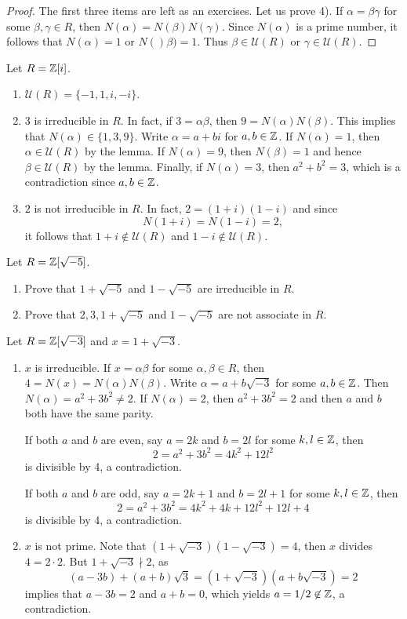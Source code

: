 \begin{proof}
	The first three items are left as an exercises. Let us prove 4). 
	If $\alpha=\beta\gamma$ for some $\beta,\gamma\in R$, then
	$N(\alpha)=N(\beta)N(\gamma)$. Since $N(\alpha)$ is a prime number, it follows that
	$N(\alpha)=1$ or $N()\beta)=1$. Thus $\beta\in\mathcal{U}(R)$ or $\gamma\in\mathcal{U}(R)$. 	
\end{proof}

\begin{example}
	Let $R=\mathbb{Z}[i]$. 
	\begin{enumerate}
		\item $\mathcal{U}(R)=\{-1,1,i,-i\}$.
		\item $3$ is irreducible in $R$. In fact, if $3=\alpha\beta$, then
			$9=N(\alpha)N(\beta)$. This implies that $N(\alpha)\in\{1,3,9\}$. Write
			$\alpha=a+bi$ for $a,b\in\mathbb{Z}$. If $N(\alpha)=1$, then $\alpha\in\mathcal{U}(R)$ by the lemma. 
			If $N(\alpha)=9$, then $N(\beta)=1$ and hence $\beta\in\mathcal{U}(R)$ by the lemma. Finally, 
			if $N(\alpha)=3$, then $a^2+b^2=3$, which is a contradiction since $a,b\in\mathbb{Z}$. 
		\item $2$ is not irreducible in $R$. In fact, $2=(1+i)(1-i)$ and
			since \[
			N(1+i)=N(1-i)=2,
			\]
			it follows that $1+i\not\in\mathcal{U}(R)$ 
			and $1-i\not\in\mathcal{U}(R)$. 
	\end{enumerate}	
\end{example}

\begin{exercise}
	Let $R=\mathbb{Z}[\sqrt{-5}]$. 
	\begin{enumerate}
		\item Prove that $1+\sqrt{-5}$ and $1-\sqrt{-5}$ are irreducible in $R$. 
		\item Prove that $2,3,1+\sqrt{-5}$ and $1-\sqrt{-5}$ are not associate in $R$.
	\end{enumerate}
\end{exercise}

\begin{example}
	Let $R=\mathbb{Z}[\sqrt{-3}]$ and $x=1+\sqrt{-3}$. 
	\begin{enumerate}
		\item $x$ is irreducible. 
	If $x=\alpha\beta$ for some $\alpha,\beta\in R$, then 
	$4=N(x)=N(\alpha)N(\beta)$. Write $\alpha=a+b\sqrt{-3}$ for some $a,b\in\mathbb{Z}$. Then
	$N(\alpha)=a^2+3b^2\ne 2$. If $N(\alpha)=2$, then $a^2+3b^2=2$ and then $a$ and $b$
	both have the same parity. 
	
	If both $a$ and $b$ are even, say $a=2k$ and $b=2l$ for
	some $k,l\in\mathbb{Z}$, then 
	\[
	2=a^2+3b^2=4k^2+12l^2
	\]
	is divisible by 4, a contradiction.  
	
	If both $a$ and $b$ are odd, say $a=2k+1$ and $b=2l+1$ for some $k,l\in\mathbb{Z}$, then
	\[
	2=a^2+3b^2=4k^2+4k+12l^2+12l+4
	\]
	is divisible by 4, a contradiction. 
		\item $x$ is not prime. Note that $(1+\sqrt{-3})(1-\sqrt{-3})=4$, then 
		$x$ divides $4=2\cdot 2$. But $1+\sqrt{-3}\nmid 2$, as 
		\[
		(a-3b)+(a+b)\sqrt{3}=(1+\sqrt{-3})(a+b\sqrt{-3})=2
		\]
		implies that $a-3b=2$ and $a+b=0$, which yields 
		$a=1/2\not\in\mathbb{Z}$, a contradiction.
	\end{enumerate}
\end{example}

